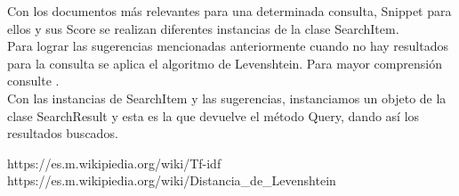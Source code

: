 \documentclass[a4paper,12pt]{article}
\begin{document}
                Con los documentos m\'as relevantes para una determinada consulta, Snippet para ellos y sus Score se realizan diferentes instancias de la clase SearchItem.\\
                Para lograr las sugerencias mencionadas anteriormente cuando no hay resultados para la consulta se aplica el algoritmo de Levenshtein. Para mayor comprensi\'on consulte \cite{Levenshtein}.\\

                Con las instancias de SearchItem y las sugerencias, instanciamos un objeto de la clase SearchResult y esta es la que devuelve el m\'etodo Query, dando as\'i los resultados buscados.



    \newpage
    \begin{thebibliography}{5}
         https://es.m.wikipiedia.org/wiki/Tf-idf
         https://es.m.wikipiedia.org/wiki/Distancia\_de\_Levenshtein
    \end{thebibliography}
\end{document}
